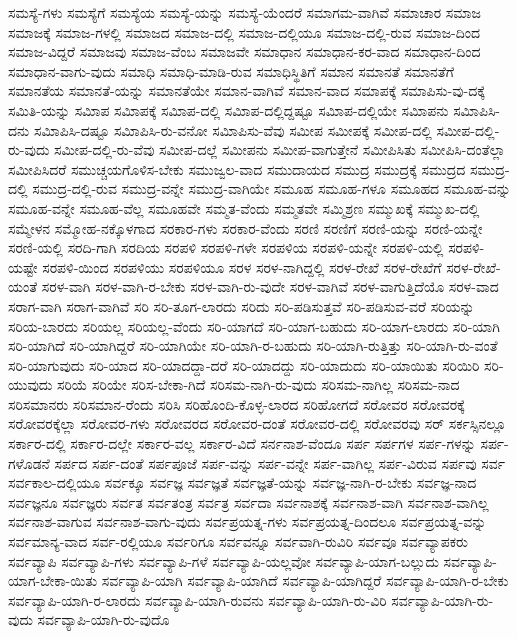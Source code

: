 {ಸಮಸ್ಯೆ-ಗಳು
ಸಮಸ್ಯೆಗೆ
ಸಮಸ್ಯೆಯ
ಸಮಸ್ಯೆ-ಯನ್ನು
ಸಮಸ್ಯೆ-ಯೆಂದರೆ
ಸಮಾಗಮ-ವಾಗಿವೆ
ಸಮಾಚಾರ
ಸಮಾಜ
ಸಮಾಜಕ್ಕೆ
ಸಮಾಜ-ಗಳಲ್ಲಿ
ಸಮಾಜದ
ಸಮಾಜ-ದಲ್ಲಿ
ಸಮಾಜ-ದಲ್ಲಿಯೂ
ಸಮಾಜ-ದಲ್ಲಿ-ರುವ
ಸಮಾಜ-ದಿಂದ
ಸಮಾಜ-ವಿದ್ದರೆ
ಸಮಾಜವು
ಸಮಾಜ-ವೆಂಬ
ಸಮಾಜವೇ
ಸಮಾಧಾನ
ಸಮಾಧಾನ-ಕರ-ವಾದ
ಸಮಾಧಾನ-ದಿಂದ
ಸಮಾಧಾನ-ವಾಗು-ವುದು
ಸಮಾಧಿ
ಸಮಾಧಿ-ಮಾಡಿ-ರುವ
ಸಮಾಧಿಸ್ಥಿತಿಗೆ
ಸಮಾನ
ಸಮಾನತೆ
ಸಮಾನತೆಗೆ
ಸಮಾನತೆಯ
ಸಮಾನತೆ-ಯನ್ನು
ಸಮಾನತೆಯೇ
ಸಮಾನ-ವಾಗಿವೆ
ಸಮಾನ-ವಾದ
ಸಮಾಪಕ್ಕೆ
ಸಮಾಪಿಸು-ವು-ದಕ್ಕೆ
ಸಮಿತಿ-ಯನ್ನು
ಸಮಿಾಪ
ಸಮಿಾಪಕ್ಕೆ
ಸಮಿಾಪ-ದಲ್ಲಿ
ಸಮಿಾಪ-ದಲ್ಲಿದ್ದಷ್ಟೂ
ಸಮಿಾಪ-ದಲ್ಲಿಯೇ
ಸಮಿಾಪನು
ಸಮಿಾಪಿಸಿ-ದನು
ಸಮಿಾಪಿಸಿ-ದಷ್ಟೂ
ಸಮಿಾಪಿಸಿ-ರು-ವನೋ
ಸಮಿಾಪಿಸು-ವೆವು
ಸಮೀಪ
ಸಮೀಪಕ್ಕೆ
ಸಮೀಪ-ದಲ್ಲಿ
ಸಮೀಪ-ದಲ್ಲಿ-ರು-ವುದು
ಸಮೀಪ-ದಲ್ಲಿ-ರು-ವೆವು
ಸಮೀಪ-ದಲ್ಲೆ
ಸಮೀಪನು
ಸಮೀಪ-ವಾಗುತ್ತೇನೆ
ಸಮೀಪಿಸಿತು
ಸಮೀಪಿಸಿ-ದಂತೆಲ್ಲಾ
ಸಮೀಪಿಸಿದರೆ
ಸಮುಚ್ಚಯಗೊಳಿಸ-ಬೇಕು
ಸಮುಜ್ವಲ-ವಾದ
ಸಮುದಾಯದ
ಸಮುದ್ರ
ಸಮುದ್ರಕ್ಕೆ
ಸಮುದ್ರದ
ಸಮುದ್ರ-ದಲ್ಲಿ
ಸಮುದ್ರ-ದಲ್ಲಿ-ರುವ
ಸಮುದ್ರ-ವನ್ನೇ
ಸಮುದ್ರ-ವಾಗಿಯೇ
ಸಮೂಹ
ಸಮೂಹ-ಗಳೂ
ಸಮೂಹದ
ಸಮೂಹ-ವನ್ನು
ಸಮೂಹ-ವನ್ನೇ
ಸಮೂಹ-ವೆಲ್ಲ
ಸಮೂಹವೇ
ಸಮ್ಮತ-ವೆಂದು
ಸಮ್ಮತವೇ
ಸಮ್ಮಿಶ್ರಣ
ಸಮ್ಮುಖಕ್ಕೆ
ಸಮ್ಮುಖ-ದಲ್ಲಿ
ಸಮ್ಮೇಳನ
ಸಮ್ಮೋಹ-ನಕ್ಕೊಳಗಾದ
ಸರಕಾರ-ಗಳು
ಸರಕಾರ-ವೆಂದು
ಸರಣಿ
ಸರಣಿಗೆ
ಸರಣಿ-ಯನ್ನು
ಸರಣಿ-ಯನ್ನೇ
ಸರಣಿ-ಯಲ್ಲಿ
ಸರದಿ-ಗಾಗಿ
ಸರದಿಯ
ಸರಪಳಿ
ಸರಪಳಿ-ಗಳೇ
ಸರಪಳಿಯ
ಸರಪಳಿ-ಯನ್ನೇ
ಸರಪಳಿ-ಯಲ್ಲಿ
ಸರಪಳಿ-ಯಷ್ಟೇ
ಸರಪಳಿ-ಯಿಂದ
ಸರಪಳಿಯು
ಸರಪಳಿಯೂ
ಸರಳ
ಸರಳ-ನಾಗಿದ್ದಲ್ಲಿ
ಸರಳ-ರೇಖೆ
ಸರಳ-ರೇಖೆಗೆ
ಸರಳ-ರೇಖೆ-ಯಂತೆ
ಸರಳ-ವಾಗಿ
ಸರಳ-ವಾಗಿ-ರ-ಬೇಕು
ಸರಳ-ವಾಗಿ-ರು-ವುದೇ
ಸರಳ-ವಾಗಿವೆ
ಸರಳ-ವಾಗುತ್ತಿದೆಯೊ
ಸರಳ-ವಾದ
ಸರಾಗ-ವಾಗಿ
ಸರಾಗ-ವಾಗಿವೆ
ಸರಿ
ಸರಿ-ತೂಗ-ಲಾರದು
ಸರಿದು
ಸರಿ-ಪಡಿಸುತ್ತವೆ
ಸರಿ-ಪಡಿಸುವ-ವರೆ
ಸರಿಯನ್ನು
ಸರಿಯ-ಬಾರದು
ಸರಿಯಲ್ಲ
ಸರಿಯಲ್ಲ-ವೆಂದು
ಸರಿ-ಯಾಗದೆ
ಸರಿ-ಯಾಗ-ಬಹುದು
ಸರಿ-ಯಾಗ-ಲಾರದು
ಸರಿ-ಯಾಗಿ
ಸರಿ-ಯಾಗಿದೆ
ಸರಿ-ಯಾಗಿದ್ದರೆ
ಸರಿ-ಯಾಗಿಯೇ
ಸರಿ-ಯಾಗಿ-ರ-ಬಹುದು
ಸರಿ-ಯಾಗಿ-ರುತ್ತಿತ್ತು
ಸರಿ-ಯಾಗಿ-ರು-ವಂತೆ
ಸರಿ-ಯಾಗುವುದು
ಸರಿ-ಯಾದ
ಸರಿ-ಯಾದದ್ದಾ-ದರೆ
ಸರಿ-ಯಾದದ್ದು
ಸರಿ-ಯಾದುದು
ಸರಿ-ಯಾಯಿತು
ಸರಿಯಿರಿ
ಸರಿ-ಯುವುದು
ಸರಿಯೆ
ಸರಿಯೇ
ಸರಿಸ-ಬೇಕಾ-ಗಿದೆ
ಸರಿಸಮ-ನಾಗಿ-ರು-ವುದು
ಸರಿಸಮ-ನಾಗಿಲ್ಲ
ಸರಿಸಮ-ನಾದ
ಸರಿಸಮಾನರು
ಸರಿಸಮಾನ-ರೆಂದು
ಸರಿಸಿ
ಸರಿಹೊಂದಿ-ಕೊಳ್ಳ-ಲಾರದ
ಸರಿಹೋಗದೆ
ಸರೋವರ
ಸರೋವರಕ್ಕೆ
ಸರೋವರಕ್ಕೆಲ್ಲಾ
ಸರೋವರ-ಗಳು
ಸರೋವರದ
ಸರೋವರ-ದಂತೆ
ಸರೋವರ-ದಲ್ಲಿ
ಸರೋವರವು
ಸರ್
ಸರ್ಕಸ್ಸಿನಲ್ಲೂ
ಸರ್ಕಾರ-ದಲ್ಲಿ
ಸರ್ಕಾರ-ದಲ್ಲೇ
ಸರ್ಕಾರ-ವಲ್ಲ
ಸರ್ಕಾರ-ವಿದೆ
ಸರ್ನನಾಶ-ವೆಂದೂ
ಸರ್ಪ
ಸರ್ಪಗಳ
ಸರ್ಪ-ಗಳನ್ನು
ಸರ್ಪ-ಗಳೊಡನೆ
ಸರ್ಪದ
ಸರ್ಪ-ದಂತೆ
ಸರ್ಪಪೂಜೆ
ಸರ್ಪ-ವನ್ನು
ಸರ್ಪ-ವನ್ನೇ
ಸರ್ಪ-ವಾಗಿಲ್ಲ
ಸರ್ಪ-ವಿರುವ
ಸರ್ಪವು
ಸರ್ವ
ಸರ್ವಕಾಲ-ದಲ್ಲಿಯೂ
ಸರ್ವಕ್ಕೂ
ಸರ್ವಜ್ಞ
ಸರ್ವಜ್ಞತೆ
ಸರ್ವಜ್ಞತೆ-ಯನ್ನು
ಸರ್ವಜ್ಞ-ನಾಗಿ-ರ-ಬೇಕು
ಸರ್ವಜ್ಞ-ನಾದ
ಸರ್ವಜ್ಞನೂ
ಸರ್ವಜ್ಞರು
ಸರ್ವತ
ಸರ್ವತಂತ್ರ
ಸರ್ವತ್ರ
ಸರ್ವದಾ
ಸರ್ವನಾಶಕ್ಕೆ
ಸರ್ವನಾಶ-ವಾಗಿ
ಸರ್ವನಾಶ-ವಾಗಿಲ್ಲ
ಸರ್ವನಾಶ-ವಾಗುವ
ಸರ್ವನಾಶ-ವಾಗು-ವುದು
ಸರ್ವಪ್ರಯತ್ನ-ಗಳು
ಸರ್ವಪ್ರಯತ್ನ-ದಿಂದಲೂ
ಸರ್ವಪ್ರಯತ್ನ-ವನ್ನು
ಸರ್ವಮಾನ್ಯ-ವಾದ
ಸರ್ವ-ರಲ್ಲಿಯೂ
ಸರ್ವರಿಗೂ
ಸರ್ವವನ್ನೂ
ಸರ್ವವಾಗಿ-ರುವಿರಿ
ಸರ್ವವೂ
ಸರ್ವವ್ಯಾಪಕರು
ಸರ್ವವ್ಯಾಪಿ
ಸರ್ವವ್ಯಾಪಿ-ಗಳು
ಸರ್ವವ್ಯಾಪಿ-ಗಳೆ
ಸರ್ವವ್ಯಾಪಿ-ಯಲ್ಲವೋ
ಸರ್ವವ್ಯಾಪಿ-ಯಾಗ-ಬಲ್ಲುದು
ಸರ್ವವ್ಯಾಪಿ-ಯಾಗ-ಬೇಕಾ-ಯಿತು
ಸರ್ವವ್ಯಾಪಿ-ಯಾಗಿ
ಸರ್ವವ್ಯಾಪಿ-ಯಾಗಿದೆ
ಸರ್ವವ್ಯಾಪಿ-ಯಾಗಿದ್ದರೆ
ಸರ್ವವ್ಯಾಪಿ-ಯಾಗಿ-ರ-ಬೇಕು
ಸರ್ವವ್ಯಾಪಿ-ಯಾಗಿ-ರ-ಲಾರದು
ಸರ್ವವ್ಯಾಪಿ-ಯಾಗಿ-ರುವನು
ಸರ್ವವ್ಯಾಪಿ-ಯಾಗಿ-ರು-ವಿರಿ
ಸರ್ವವ್ಯಾಪಿ-ಯಾಗಿ-ರು-ವುದು
ಸರ್ವವ್ಯಾಪಿ-ಯಾಗಿ-ರು-ವುದೊ
}
